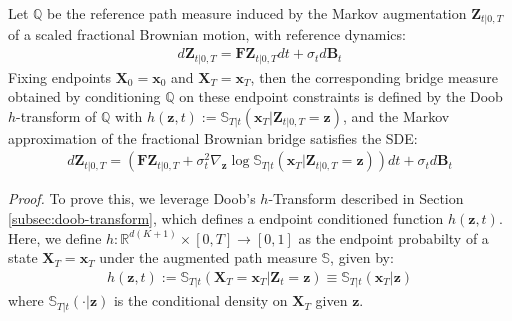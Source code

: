 \documentclass{article}
\begin{document}
\begin{proposition}\label{prop:markov-approx-fractional-bridge}
    Let $\mathbb{Q}$ be the reference path measure induced by the Markov augmentation $\boldsymbol{Z}_{t|0,T}$ of a scaled fractional Brownian motion, with reference dynamics:
    \begin{align}
        d\boldsymbol{Z}_{t|0,T}=\boldsymbol{F}\boldsymbol{Z}_{t|0,T}dt+\sigma_td\boldsymbol{B}_t
    \end{align}
    Fixing endpoints $\boldsymbol{X}_0=\boldsymbol{x}_0$ and $\boldsymbol{X}_T=\boldsymbol{x}_T$, then the corresponding bridge measure  obtained by conditioning $\mathbb{Q}$ on these endpoint constraints is defined by the Doob $h$-transform of $\mathbb{Q}$ with $h(\boldsymbol{z},t):=\mathbb{S}_{T|t}(\boldsymbol{x}_T|\boldsymbol{Z}_{t|0,T}=\boldsymbol{z})$, and the Markov approximation of the fractional Brownian bridge satisfies the SDE:
    \begin{align}
        d\boldsymbol{Z}_{t|0,T}=(\boldsymbol{F}\boldsymbol{Z}_{t|0,T}+\sigma_t^2\nabla_{\boldsymbol{z}} \log \mathbb{S}_{T|t}(\boldsymbol{x}_T|\boldsymbol{Z}_{t|0,T}=\boldsymbol{z}))dt+\sigma_td\boldsymbol{B}_t
    \end{align}
\end{proposition}

\textit{Proof.} To prove this, we leverage Doob's $h$-Transform described in Section \ref{subsec:doob-transform}, which defines a endpoint conditioned function $h(\boldsymbol{z},t)$. Here, we define $h:\mathbb{R}^{d(K+1)}\times[0,T]\to [0,1]$ as the endpoint probabilty of a state $\boldsymbol{X}_T=\boldsymbol{x}_T$ under the augmented path measure $\mathbb{S}$, given by:
\begin{align}
    h(\boldsymbol{z},t):=\mathbb{S}_{T|t}(\boldsymbol{X}_T=\boldsymbol{x}_T|\boldsymbol{Z}_t=\boldsymbol{z})\equiv\mathbb{S}_{T|t}(\boldsymbol{x}_T|\boldsymbol{z})
\end{align}
where $\mathbb{S}_{T|t}(\cdot|\boldsymbol{z})$ is the conditional density on $\boldsymbol{X}_T$ given $\boldsymbol{z}$. 
\end{document}
